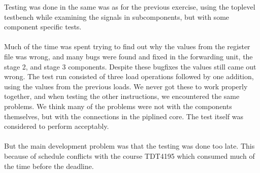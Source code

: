 Testing was done in the same was as for the previous exercise, using the
toplevel testbench while examining the signals in subcomponents, but with some
component specific tests.
\paragraph*{}
Much of the time was spent trying to find out why the values from the register
file was wrong, and many bugs were found and fixed in the forwarding unit, the
stage 2, and stage 3 components. Despite these bugfixes the values still came
out wrong. The test run consisted of three load operations followed by one
addition, using the values from the previous loads. We never got these to work properly together, and when testing the other instructions, we encountered the same problems. We think many of the problems were not with the components themselves, but with the connections in the piplined core. The test itself was
considered to perform acceptably.
\paragraph*{}
But the main development problem was that the testing was done too late. This
because of schedule conflicts with the course TDT4195 which consumed much of the
time before the deadline.
